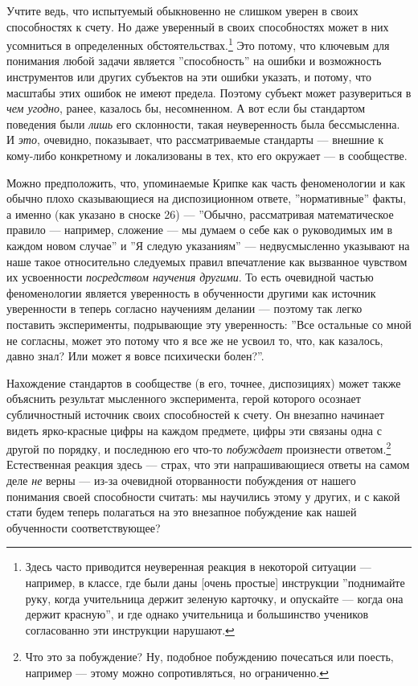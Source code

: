 \documentclass[11pt]{book}
\begin{document}
Учтите ведь, что испытуемый обыкновенно не слишком уверен в своих способностях к счету. Но даже уверенный в своих способностях может в них усомниться в определенных обстоятельствах.\footnote{Здесь часто приводится неуверенная реакция в некоторой ситуации --- например, в классе, где были даны [очень простые] инструкции ''поднимайте руку, когда учительница держит зеленую карточку, и опускайте --- когда она держит красную'', и где однако учительница и большинство учеников согласованно эти инструкции нарушают.} Это потому, что ключевым для понимания любой задачи является ''способность'' на ошибки и возможность инструментов или других субъектов на эти ошибки указать, и потому, что масштабы этих ошибок не имеют предела. Поэтому субъект может разувериться в \textit{чем угодно}, ранее, казалось бы, несомненном. А вот если бы стандартом поведения были \textit{лишь} его склонности, такая неуверенность была бессмысленна. И \textit{это}, очевидно, показывает, что рассматриваемые стандарты --- внешние к кому-либо конкретному и локализованы в тех, кто его окружает --- в сообществе.

Можно предположить, что, упоминаемые Крипке как часть феноменологии и как обычно плохо сказывающиеся на диспозиционном ответе, ''нормативные'' факты, а именно (как указано в сноске 26) --- ''Обычно, рассматривая математическое правило --- например, сложение --- мы думаем о себе как о руководимых им в каждом новом случае'' и ''Я следую указаниям'' --- недвусмысленно указывают на наше такое относительно следуемых правил впечатление как вызванное чувством их усвоенности \textit{посредством научения другими}. То есть очевидной частью феноменологии является уверенность в обученности другими как источник уверенности в теперь согласно научениям делании --- поэтому так легко поставить эксперименты, подрывающие эту уверенность: ''Все остальные со мной не согласны, может это потому что я все же не усвоил то, что, как казалось, давно знал? Или может я вовсе психически болен?''.

Нахождение стандартов в сообществе (в его, точнее, диспозициях) может также объяснить результат мысленного эксперимента, герой которого осознает субличностный источник своих способностей к счету. Он внезапно начинает видеть ярко-красные цифры на каждом предмете, цифры эти связаны одна с другой по порядку, и последнюю его что-то \textit{побуждает} произнести ответом.\footnote{Что это за побуждение? Ну, подобное побуждению почесаться или поесть, например --- этому можно сопротивляться, но ограниченно.} Естественная реакция здесь --- страх, что эти напрашивающиеся ответы на самом деле \textit{не} верны --- из-за очевидной оторванности побуждения от нашего понимания своей способности считать: мы научились этому у других, и с какой стати будем теперь полагаться на это внезапное побуждение как нашей обученности соответствующее?
\end{document}
